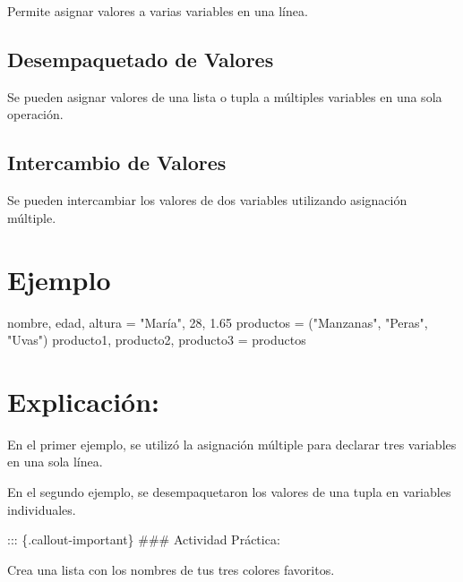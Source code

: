 \documentclass[
  a4paper,
  onepage,
  openany]{scrreprt}
\newenvironment{Shaded}{\begin{snugshade}}{\end{snugshade}}
\newcommand{\DecValTok}[1]{\textcolor[rgb]{0.68,0.00,0.00}{#1}}
\newcommand{\FloatTok}[1]{\textcolor[rgb]{0.68,0.00,0.00}{#1}}
\newcommand{\NormalTok}[1]{\textcolor[rgb]{0.00,0.23,0.31}{#1}}
\newcommand{\OperatorTok}[1]{\textcolor[rgb]{0.37,0.37,0.37}{#1}}
\newcommand{\StringTok}[1]{\textcolor[rgb]{0.13,0.47,0.30}{#1}}
\begin{document}
Permite asignar valores a varias variables en una línea.

\hypertarget{desempaquetado-de-valores-1}{%
\subsection{Desempaquetado de
Valores}\label{desempaquetado-de-valores-1}}

Se pueden asignar valores de una lista o tupla a múltiples variables en
una sola operación.

\hypertarget{intercambio-de-valores-1}{%
\subsection{Intercambio de Valores}\label{intercambio-de-valores-1}}

Se pueden intercambiar los valores de dos variables utilizando
asignación múltiple.

\hypertarget{ejemplo-13}{%
\section{Ejemplo}\label{ejemplo-13}}

\begin{Shaded}
\begin{Highlighting}[]
\NormalTok{nombre, edad, altura }\OperatorTok{=} \StringTok{"María"}\NormalTok{, }\DecValTok{28}\NormalTok{, }\FloatTok{1.65}
\NormalTok{productos }\OperatorTok{=}\NormalTok{ (}\StringTok{"Manzanas"}\NormalTok{, }\StringTok{"Peras"}\NormalTok{, }\StringTok{"Uvas"}\NormalTok{)}
\NormalTok{producto1, producto2, producto3 }\OperatorTok{=}\NormalTok{ productos}
\end{Highlighting}
\end{Shaded}

\hypertarget{explicaciuxf3n-13}{%
\section{Explicación:}\label{explicaciuxf3n-13}}

En el primer ejemplo, se utilizó la asignación múltiple para declarar
tres variables en una sola línea.

En el segundo ejemplo, se desempaquetaron los valores de una tupla en
variables individuales.

::: \{.callout-important\} \#\#\# Actividad Práctica:

Crea una lista con los nombres de tus tres colores favoritos.
\end{document}
